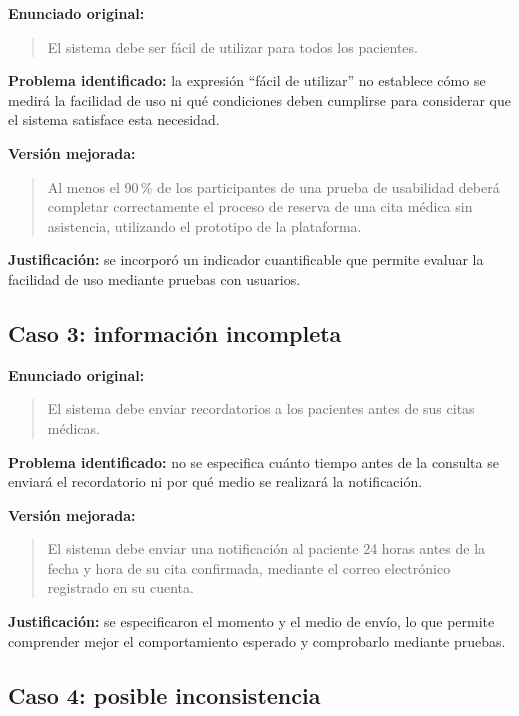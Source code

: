 \documentclass[12pt,a4paper]{article}
\begin{document}
\textbf{Enunciado original:}

\begin{quote}
El sistema debe ser fácil de utilizar para todos los pacientes.
\end{quote}

\textbf{Problema identificado:} la expresión ``fácil de utilizar'' no establece cómo se medirá la facilidad de uso ni qué condiciones deben cumplirse para considerar que el sistema satisface esta necesidad.

\textbf{Versión mejorada:}

\begin{quote}
Al menos el 90\,\% de los participantes de una prueba de usabilidad deberá completar correctamente el proceso de reserva de una cita médica sin asistencia, utilizando el prototipo de la plataforma.
\end{quote}

\textbf{Justificación:} se incorporó un indicador cuantificable que permite evaluar la facilidad de uso mediante pruebas con usuarios.

\subsection{Caso 3: información incompleta}

\textbf{Enunciado original:}

\begin{quote}
El sistema debe enviar recordatorios a los pacientes antes de sus citas médicas.
\end{quote}

\textbf{Problema identificado:} no se especifica cuánto tiempo antes de la consulta se enviará el recordatorio ni por qué medio se realizará la notificación.

\textbf{Versión mejorada:}

\begin{quote}
El sistema debe enviar una notificación al paciente 24 horas antes de la fecha y hora de su cita confirmada, mediante el correo electrónico registrado en su cuenta.
\end{quote}

\textbf{Justificación:} se especificaron el momento y el medio de envío, lo que permite comprender mejor el comportamiento esperado y comprobarlo mediante pruebas.

\subsection{Caso 4: posible inconsistencia}
\end{document}
